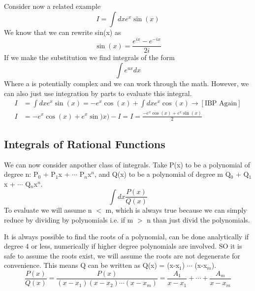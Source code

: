 \documentclass{article}
\newcommand{\be}{\begin{equation}}
\newcommand{\ee}{\end{equation}}
\begin{document}
Consider now a related example
\be
I = \int dx e^x \sin(x)
\ee
We know that we can rewrite sin(x) as
\be
\sin(x) = \frac{e^{ix}-e^{-ix}}{2i}
\ee
If we make the substitution we find integrals of the form
\be
\int e^{ax} dx
\ee
Where a is potentially complex and we can work through the math.
However, we can also just use integration by parts to evaluate this integral.
\be
\begin{split}
	I &= \int dx e^x \sin(x) = -e^x \cos(x) + \int dx e^x \cos(x) \rightarrow[\text{IBP Again}]\\
	I &= -e^x \cos(x) + e^x \sin)x) - I = I = \frac{-e^x \cos(x) + e^x \sin(x)}{2}
\end{split}
\ee

\subsection*{Integrals of Rational Functions}
We can now consider anpother class of integrals.
Take P(x) to be a polynomial of degree n: P$_0$ + P$_1$x + $\cdots$ P$_n$x$^n$, and Q(x) to be a polynomial of degree m  Q$_0$ + Q$_1$x + $\cdots$ Q$_n$x$^n$.
\be
\int dx \frac{P(x)}{Q(x)}
\ee
To evaluate we will assume n $<$ m, which is always true because we can simply reduce by dividing by polynomials i.e. if m $>$ n than just divid the polynomials.

It is always possible to find the roots of a polynomial, can be done analytically if degree 4 or less, numerically if higher degree polynomials are involved.
SO it is safe to assume the roots exist, we will assume the roots are not degenerate for convenience.
This means Q can be written as Q(x) = (x-x$_1$) $\cdots$ (x-x$_m$).
\be
\frac{P(x)}{Q(x)} = \frac{P(x)}{(x-x_1)(x-x_2)\cdots(x-x_m)} = \frac{A_1}{x-x_1} + \cdots + \frac{A_m}{x-x_m}
\ee
\end{document}
